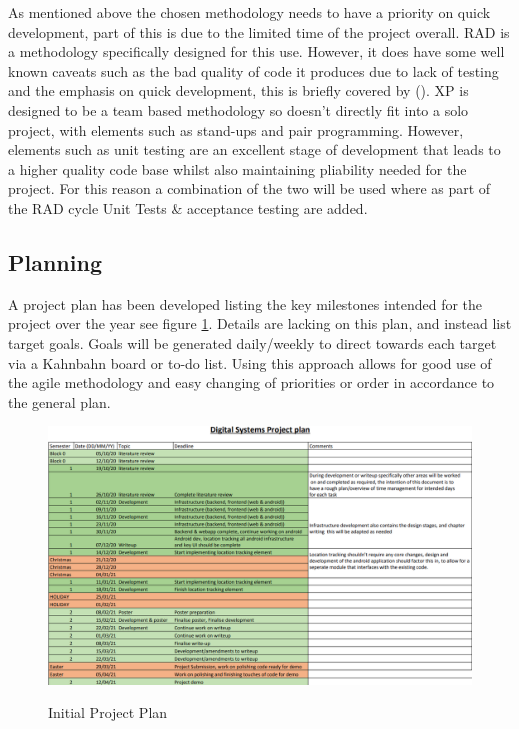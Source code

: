 As mentioned above the chosen methodology needs to have a priority on quick development, part of this is due to the limited time of the project overall. RAD is a methodology specifically designed for this use. However, it does have some well known caveats such as the bad quality of code it produces due to lack of testing and the emphasis on quick development, this is briefly covered by (\cite{kissflow_2019_rapid}). XP is designed to be a team based methodology so doesn't directly fit into a solo project, with elements such as stand-ups and pair programming. However, elements such as unit testing are an excellent stage of development that leads to a higher quality code base whilst also maintaining pliability needed for the project. For this reason a combination of the two will be used where as part of the RAD cycle Unit Tests \& acceptance testing are added.
\pagebreak
\subsection{Planning}
A project plan has been developed listing the key milestones intended for the project over the year see figure \ref{fig:projlan}. Details are lacking on this plan, and instead list target goals. Goals will be generated daily/weekly to direct towards each target via a Kahnbahn board or to-do list. Using this approach allows for good use of the agile methodology and easy changing of priorities or order in accordance to the general plan.

\begin{figure}[h]
	\includegraphics[width=\linewidth]{./images/planning/projectplan.png}\\
	\caption{Initial Project Plan}
	\label{fig:projlan}
\end{figure}

